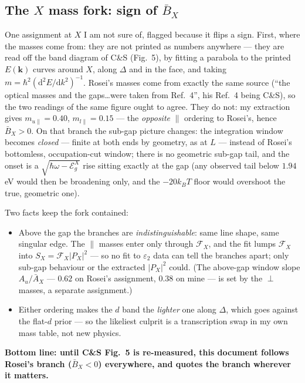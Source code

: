 \documentclass[11pt,a4paper]{article}
\numberwithin{equation}{section}
\begin{document}
\subsection{The $X$ mass fork: sign of ${\bar{B}}_X$}\label{sec:fork}

One assignment at $X$ I am not sure of, flagged because it flips a
sign.  First, where the masses come from: they are not printed as
numbers anywhere --- they are read off the band diagram of C\&S
(Fig.~5), by fitting a parabola to the printed $E(\mathbf k)$ curves
around $X$, along $\Delta$ and in the face, and taking
$m=\hbar^2({\mathrm{d}}^2E/{\mathrm{d}} k^2)^{-1}$.  Rosei's masses come from exactly
the same source (``the optical masses and the gaps\ldots were taken
from Ref.~4'', his Ref.~4 being C\&S), so the two readings of the same
figure ought to agree.  They do not: my extraction gives
$m_{u\parallel}=0.40$, $m_{l\parallel}=0.15$ --- the \emph{opposite}
$\parallel$ ordering to Rosei's, hence ${\bar{B}}_X>0$.  On that branch the
sub-gap picture changes: the integration window becomes \emph{closed}
--- finite at both ends by geometry, as at $L$ --- instead of Rosei's
bottomless, occupation-cut window; there is no geometric sub-gap tail,
and the onset is a $\sqrt{{\hbar\omega}-{\mathcal{E}_g^{X}}}$ rise sitting exactly at the gap
(any observed tail below $1.94$ eV would then be broadening only, and
the $-20{k_B} T$ floor would overshoot the true, geometric one).

Two facts keep the fork contained:
\begin{itemize}
\item Above the gap the branches are \emph{indistinguishable}: same line shape, same singular edge.  The $\parallel$ masses enter only through ${\mathcal{F}}_X$, and the fit lumps ${\mathcal{F}}_X$ into $S_X={\mathcal{F}}_X|P_X|^2$ --- so no fit to ${\varepsilon}_2$ data can tell the branches apart; only sub-gap behaviour or the extracted $|P_X|^2$ could.  (The above-gap window slope $A_u/{\bar{A}}_X$ --- $0.62$ on Rosei's assignment, $0.38$ on mine --- is set by the $\perp$ masses, a separate assignment.)
\item Either ordering makes the $d$ band the \emph{lighter} one along $\Delta$, which goes against the flat-$d$ prior --- so the likeliest culprit is a transcription swap in my own mass table, not new physics.
\end{itemize}

\noindent\textbf{Bottom line: until C\&S Fig.~5 is re-measured, this
document follows Rosei's branch (${\bar{B}}_X<0$) everywhere, and quotes the
branch wherever it matters.}
\end{document}
